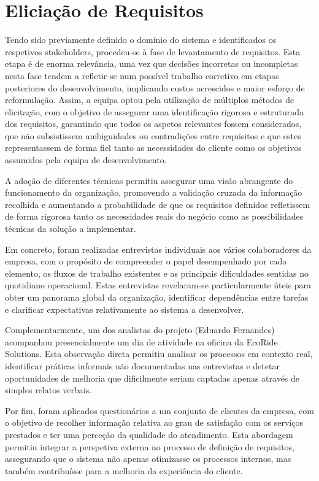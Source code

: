 \documentclass[a4paper,12pt]{scrreprt}
\begin{document}
\section{Eliciação de Requisitos}
Tendo sido previamente definido o domínio do sistema e identificados os respetivos stakeholders, procedeu-se à fase de levantamento de requisitos. Esta etapa é de enorma relevância, uma vez que decisões incorretas ou incompletas nesta fase tendem a refletir-se num possível trabalho corretivo  em etapas posteriores do desenvolvimento, implicando custos acrescidos e maior esforço de reformulação. Assim, a equipa optou pela utilização de múltiplos métodos de elicitação, com o objetivo de assegurar uma identificação rigorosa e estruturada dos requisitos, garantindo que todos os aspetos relevantes fossem considerados, que não subsistissem ambiguidades ou contradições entre requisitos e que estes representassem de forma fiel tanto as necessidades do cliente como os objetivos assumidos pela equipa de desenvolvimento.

A adoção de diferentes técnicas permitiu assegurar uma visão abrangente do funcionamento da organização, promovendo a validação cruzada da informação recolhida e aumentando a probabilidade de que os requisitos definidos refletissem de forma rigorosa tanto as necessidades reais do negócio como as possibilidades técnicas da solução a implementar.

Em concreto, foram realizadas entrevistas individuais aos vários colaboradores da empresa, com o propósito de compreender o papel desempenhado por cada elemento, os fluxos de trabalho existentes e as principais dificuldades sentidas no quotidiano operacional. Estas entrevistas revelaram-se particularmente úteis para obter um panorama global da organização, identificar dependências entre tarefas e clarificar expectativas relativamente ao sistema a desenvolver.

Complementarmente, um dos analistas do projeto (Eduardo Fernandes) acompanhou presencialmente um dia de atividade na oficina da EcoRide Solutions. Esta observação direta permitiu analisar os processos em contexto real, identificar práticas informais não documentadas nas entrevistas e detetar oportunidades de melhoria que dificilmente seriam captadas apenas através de simples relatos verbais.

Por fim, foram aplicados questionários a um conjunto de clientes da empresa, com o objetivo de recolher informação relativa ao grau de satisfação com os serviços prestados e ter uma perceção da qualidade do atendimento. Esta abordagem permitiu integrar a perspetiva externa no processo de definição de requisitos, assegurando que o sistema não apenas otimizasse os processos internos, mas também contribuísse para a melhoria da experiência do cliente.
\end{document}

